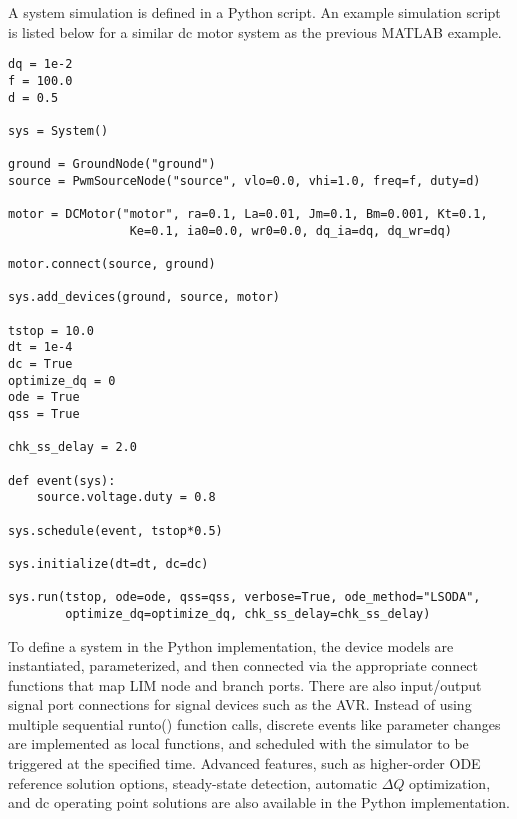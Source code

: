 A system simulation is defined in a Python script. An example simulation script is listed below for a similar dc motor system as the previous MATLAB example.

\bigskip

\begin{lstlisting}
dq = 1e-2
f = 100.0
d = 0.5

sys = System()

ground = GroundNode("ground")
source = PwmSourceNode("source", vlo=0.0, vhi=1.0, freq=f, duty=d)
                        
motor = DCMotor("motor", ra=0.1, La=0.01, Jm=0.1, Bm=0.001, Kt=0.1,
                 Ke=0.1, ia0=0.0, wr0=0.0, dq_ia=dq, dq_wr=dq)

motor.connect(source, ground)

sys.add_devices(ground, source, motor)

tstop = 10.0
dt = 1e-4
dc = True
optimize_dq = 0
ode = True
qss = True

chk_ss_delay = 2.0

def event(sys):
    source.voltage.duty = 0.8

sys.schedule(event, tstop*0.5)

sys.initialize(dt=dt, dc=dc)

sys.run(tstop, ode=ode, qss=qss, verbose=True, ode_method="LSODA",
        optimize_dq=optimize_dq, chk_ss_delay=chk_ss_delay)

\end{lstlisting}

To define a system in the Python implementation, the device models are instantiated, parameterized, and then connected via the appropriate connect functions that map LIM node and branch ports. There are also input/output signal port connections for signal devices such as the AVR. Instead of using multiple sequential runto() function calls, discrete events like parameter changes are implemented as local functions, and scheduled with the simulator to be triggered at the specified time. Advanced features, such as higher-order ODE reference solution options, steady-state detection, automatic $\Delta Q$ optimization, and dc operating point solutions are also available in the Python implementation. 